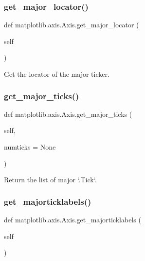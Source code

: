 \subsubsection{\texorpdfstring{get\+\_\+major\+\_\+locator()}{get\_major\_locator()}}
{\footnotesize\ttfamily def matplotlib.\+axis.\+Axis.\+get\+\_\+major\+\_\+locator (\begin{DoxyParamCaption}\item[{}]{self }\end{DoxyParamCaption})}

\begin{DoxyVerb}Get the locator of the major ticker.\end{DoxyVerb}
 \mbox{\label{classmatplotlib_1_1axis_1_1Axis_a67ef6a02580550302abc1b27b880f8c0}} 
\subsubsection{\texorpdfstring{get\+\_\+major\+\_\+ticks()}{get\_major\_ticks()}}
{\footnotesize\ttfamily def matplotlib.\+axis.\+Axis.\+get\+\_\+major\+\_\+ticks (\begin{DoxyParamCaption}\item[{}]{self,  }\item[{}]{numticks = {\ttfamily None} }\end{DoxyParamCaption})}

\begin{DoxyVerb}Return the list of major `.Tick`\s.\end{DoxyVerb}
 \mbox{\label{classmatplotlib_1_1axis_1_1Axis_a4882da48bc43dd09a7bffa53857cf864}} 
\subsubsection{\texorpdfstring{get\+\_\+majorticklabels()}{get\_majorticklabels()}}
{\footnotesize\ttfamily def matplotlib.\+axis.\+Axis.\+get\+\_\+majorticklabels (\begin{DoxyParamCaption}\item[{}]{self }\end{DoxyParamCaption})}

